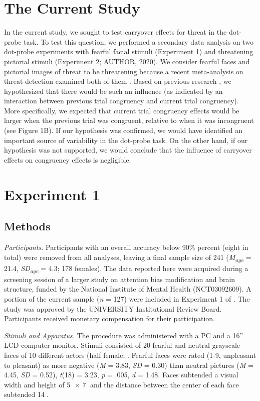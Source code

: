 \documentclass{article}
\begin{document}
\section{The Current Study}

In the current study, we sought to test carryover effects for threat in the dot-probe task. To test this question, we performed a secondary data analysis on two dot-probe experiments with fearful facial stimuli (Experiment 1) and threatening pictorial stimuli (Experiment 2; AUTHOR, 2020). We consider fearful faces and pictorial images of threat to be threatening because a recent meta-analysis on threat detection examined both of them \parencite{Hedger2016}. Based on previous research \parencite{Gladwin2019a, Gladwin2020a}, we hypothesized that there would be such an influence (as indicated by an interaction between previous trial congruency and current trial congruency). More specifically, we expected that current trial congruency effects would be larger when the previous trial was congruent, relative to when it was incongruent (see Figure 1B). If our hypothesis was confirmed, we would have identified an important source of variability in the dot-probe task. On the other hand, if our hypothesis was not supported, we would conclude that the influence of carryover effects on congruency effects is negligible.

\section{Experiment 1}

\subsection{Methods}

\emph{Participants. }Participants with an overall accuracy below 90\% percent (eight in total) were removed from all analyses, leaving a final sample size of 241 (\emph{M}\textsubscript{\emph{age}} = 21.4, \emph{SD}\textsubscript{\emph{age}} = 4.3; 178 females). The data reported here were acquired during a screening session of a larger study on attention bias modification and brain structure, funded by the National Institute of Mental Health (NCT03092609). A portion of the current sample (\emph{n} = 127) were included in Experiment 1 of \parencite{Carlson2020}. The study was approved by the UNIVERSITY Institutional Review Board. Participants received monetary compensation for their participation.

\emph{Stimuli and Apparatus. }The procedure was administered with a PC and a 16” LCD computer monitor. Stimuli consisted of 20 fearful and neutral grayscale faces of 10 different actors (half female; \parencite{Gur2002, Lundqvist1998}. Fearful faces were rated (1-9, unpleasant to pleasant) as more negative (\emph{M} = 3.83, \emph{SD} = 0.30) than neutral pictures (\emph{M} = 4.45, \emph{SD} = 0.52), \emph{t}(18) = 3.23, \emph{p} = .005, \emph{d} = 1.48. Faces subtended a visual width and height of 5 × 7 and the distance between the center of each face subtended 14.
\end{document}
